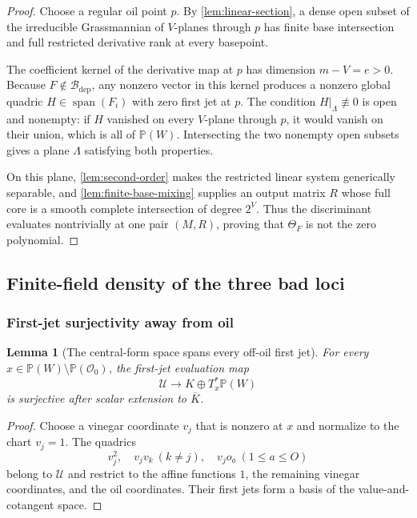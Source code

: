 \documentclass[10pt,a4paper]{article}
\newtheorem{lemma}[theorem]{Lemma}
\newcommand{\PP}{\mathbb P}
\newcommand{\cO}{\mathcal O}
\newcommand{\cB}{\mathcal B}
\newcommand{\cU}{\mathcal U}
\newcommand{\Span}{\operatorname{span}}
\newcommand{\dep}{\mathrm{dep}}
\begin{document}
\begin{proof}
Choose a regular oil point $p$.  By \cref{lem:linear-section}, a dense open subset of the irreducible Grassmannian of $V$-planes through $p$ has finite base intersection and full restricted derivative rank at every basepoint.

The coefficient kernel of the derivative map at $p$ has dimension $m-V=e>0$.  Because $F\notin\cB_{\dep}$, any nonzero vector in this kernel produces a nonzero global quadric $H\in\Span(F_i)$ with zero first jet at $p$.  The condition $H|_\Lambda\not\equiv0$ is open and nonempty: if $H$ vanished on every $V$-plane through $p$, it would vanish on their union, which is all of $\PP(W)$.  Intersecting the two nonempty open subsets gives a plane $\Lambda$ satisfying both properties.

On this plane, \cref{lem:second-order} makes the restricted linear system generically separable, and \cref{lem:finite-base-mixing} supplies an output matrix $R$ whose full core is a smooth complete intersection of degree $2^V$.  Thus the discriminant evaluates nontrivially at one pair $(M,R)$, proving that $\Theta_F$ is not the zero polynomial.
\end{proof}

\subsection{Finite-field density of the three bad loci}

\subsubsection{First-jet surjectivity away from oil}

\begin{lemma}[The central-form space spans every off-oil first jet]\label{lem:jet-surj}
For every $x\in\PP(W)\setminus\PP(\cO_0)$, the first-jet evaluation map
\[
\cU\longrightarrow K\oplus T_x^*\PP(W)
\]
is surjective after scalar extension to $\overline K$.
\end{lemma}

\begin{proof}
Choose a vinegar coordinate $v_j$ that is nonzero at $x$ and normalize to the chart $v_j=1$.  The quadrics
\[
v_j^2,\quad v_jv_k\ (k\ne j),\quad v_jo_a\ (1\le a\le O)
\]
belong to $\cU$ and restrict to the affine functions $1$, the remaining vinegar coordinates, and the oil coordinates.  Their first jets form a basis of the value-and-cotangent space.
\end{proof}
\end{document}
